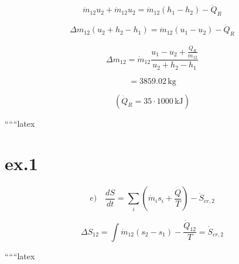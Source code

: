 \begin{equation*}
\dot{m}_{12} u_2 + \dot{m}_{12} u_2 = \dot{m}_{12} \left( h_1 - h_2 \right) - \dot{Q}_R
\end{equation*}

\begin{equation*}
\Delta m_{12} \left( u_2 + h_2 - h_1 \right) = \dot{m}_{12} \left( u_1 - u_2 \right) - \dot{Q}_R
\end{equation*}

\begin{equation*}
\Delta m_{12} = \dot{m}_{12} \frac{u_1 - u_2 + \frac{\dot{Q}_R}{\dot{m}_{12}}}{u_2 + h_2 - h_1}
\end{equation*}

\begin{equation*}
= \boxed{3859.02 \, \text{kg}}
\end{equation*}

\begin{equation*}
\left( \dot{Q}_R = 35 \cdot 1000 \, \text{kJ} \right)
\end{equation*}

``````latex


\section*{ex.1}

\begin{equation*}
e) \quad \frac{dS}{dt} = \sum_i \left( \dot{m}_i s_i + \frac{\dot{Q}}{T} \right) - \dot{S}_{cr,2}
\end{equation*}

\begin{equation*}
\Delta S_{12} = \int \dot{m}_{12} (s_2 - s_1) - \frac{\dot{Q}_{12}}{T} = \dot{S}_{cr,2}
\end{equation*}

``````latex


